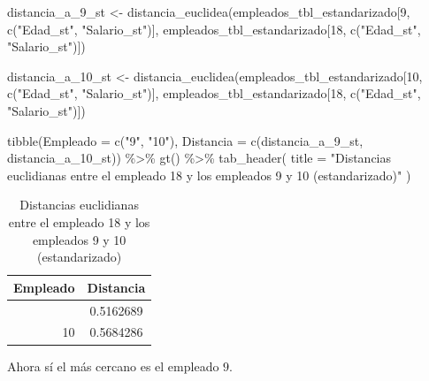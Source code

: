 \documentclass[
  letterpaper,
  DIV=11,
  numbers=noendperiod,
  oneside]{scrreprt}
\newenvironment{Shaded}{\begin{snugshade}}{\end{snugshade}}
\newcommand{\AttributeTok}[1]{\textcolor[rgb]{0.40,0.45,0.13}{#1}}
\newcommand{\DecValTok}[1]{\textcolor[rgb]{0.68,0.00,0.00}{#1}}
\newcommand{\FunctionTok}[1]{\textcolor[rgb]{0.28,0.35,0.67}{#1}}
\newcommand{\NormalTok}[1]{\textcolor[rgb]{0.00,0.23,0.31}{#1}}
\newcommand{\OtherTok}[1]{\textcolor[rgb]{0.00,0.23,0.31}{#1}}
\newcommand{\SpecialCharTok}[1]{\textcolor[rgb]{0.37,0.37,0.37}{#1}}
\newcommand{\StringTok}[1]{\textcolor[rgb]{0.13,0.47,0.30}{#1}}
\begin{document}
\begin{Shaded}
\begin{Highlighting}[]
\NormalTok{distancia\_a\_9\_st }\OtherTok{\textless{}{-}} \FunctionTok{distancia\_euclidea}\NormalTok{(empleados\_tbl\_estandarizado[}\DecValTok{9}\NormalTok{, }\FunctionTok{c}\NormalTok{(}\StringTok{"Edad\_st"}\NormalTok{, }\StringTok{"Salario\_st"}\NormalTok{)],}
\NormalTok{                                        empleados\_tbl\_estandarizado[}\DecValTok{18}\NormalTok{, }\FunctionTok{c}\NormalTok{(}\StringTok{"Edad\_st"}\NormalTok{, }\StringTok{"Salario\_st"}\NormalTok{)])}

\NormalTok{distancia\_a\_10\_st }\OtherTok{\textless{}{-}} \FunctionTok{distancia\_euclidea}\NormalTok{(empleados\_tbl\_estandarizado[}\DecValTok{10}\NormalTok{, }\FunctionTok{c}\NormalTok{(}\StringTok{"Edad\_st"}\NormalTok{, }\StringTok{"Salario\_st"}\NormalTok{)],}
\NormalTok{                                         empleados\_tbl\_estandarizado[}\DecValTok{18}\NormalTok{, }\FunctionTok{c}\NormalTok{(}\StringTok{"Edad\_st"}\NormalTok{, }\StringTok{"Salario\_st"}\NormalTok{)])}

\FunctionTok{tibble}\NormalTok{(}\AttributeTok{Empleado =} \FunctionTok{c}\NormalTok{(}\StringTok{"9"}\NormalTok{, }\StringTok{"10"}\NormalTok{),}
       \AttributeTok{Distancia =} \FunctionTok{c}\NormalTok{(distancia\_a\_9\_st, distancia\_a\_10\_st)) }\SpecialCharTok{\%\textgreater{}\%}
  \FunctionTok{gt}\NormalTok{() }\SpecialCharTok{\%\textgreater{}\%}
  \FunctionTok{tab\_header}\NormalTok{(}
    \AttributeTok{title =} \StringTok{"Distancias euclidianas entre el empleado 18 y los empleados 9 y 10 (estandarizado)"}
\NormalTok{  )}
\end{Highlighting}
\end{Shaded}

\begin{table}
\caption*{
{\large Distancias euclidianas entre el empleado 18 y los empleados 9 y 10 (estandarizado)}
} 
\fontsize{12.0pt}{14.4pt}\selectfont
\begin{tabular*}{\linewidth}{@{\extracolsep{\fill}}rc}
\toprule
Empleado & Distancia \\ 
\midrule\addlinespace[2.5pt]
9 & 0.5162689 \\ 
10 & 0.5684286 \\ 
\bottomrule
\end{tabular*}
\end{table}

Ahora sí el más cercano es el empleado \(9\).
\end{document}
